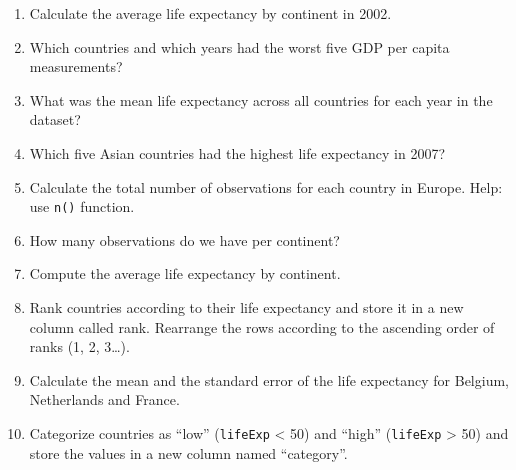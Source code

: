 \documentclass[]{article}
\begin{document}
\begin{enumerate}
\def\labelenumi{\arabic{enumi}.}
\setcounter{enumi}{11}
\item
  Calculate the average life expectancy by continent in 2002.
\item
  Which countries and which years had the worst five GDP per capita
  measurements?
\item
  What was the mean life expectancy across all countries for each year
  in the dataset?
\item
  Which five Asian countries had the highest life expectancy in 2007?
\item
  Calculate the total number of observations for each country in Europe.
  Help: use \texttt{n()} function.
\item
  How many observations do we have per continent?
\item
  Compute the average life expectancy by continent.
\item
  Rank countries according to their life expectancy and store it in a
  new column called rank. Rearrange the rows according to the ascending
  order of ranks (1, 2, 3\ldots{}).
\item
  Calculate the mean and the standard error of the life expectancy for
  Belgium, Netherlands and France.
\item
  Categorize countries as ``low'' (\texttt{lifeExp} \textless{} 50) and
  ``high'' (\texttt{lifeExp} \textgreater{} 50) and store the values in
  a new column named ``category''.
\end{enumerate}
\end{document}
